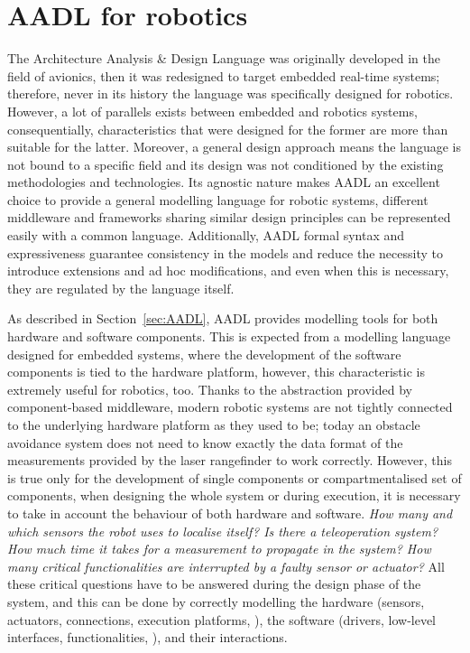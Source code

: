 \section{AADL for robotics}
\label{sec:aadl-robot}
The Architecture Analysis \& Design Language was originally developed in the field of avionics, then it was redesigned to target embedded real-time systems; therefore, never in its history the language was specifically designed for robotics. However, a lot of parallels exists between embedded and robotics systems, consequentially, characteristics that were designed for the former are more than suitable for the latter. Moreover, a general design approach means the language is not bound to a specific field and its design was not conditioned by the existing methodologies and technologies. Its agnostic nature makes AADL an excellent choice to provide a general modelling language for robotic systems, different middleware and frameworks sharing similar design principles can be represented easily with a common language. Additionally, AADL formal syntax and expressiveness guarantee consistency in the models and reduce the necessity to introduce extensions and ad hoc modifications, and even when this is necessary, they are regulated by the language itself.

As described in Section~\ref{sec:AADL}, AADL provides modelling tools for both hardware and software components. This is expected from a modelling language designed for embedded systems, where the development of the software components is tied to the hardware platform, however, this characteristic is extremely useful for robotics, too. Thanks to the abstraction provided by component-based middleware, modern robotic systems are not tightly connected to the underlying hardware platform as they used to be; today an obstacle avoidance system does not need to know exactly the data format of the measurements provided by the laser rangefinder to work correctly. However, this is true only for the development of single components or compartmentalised set of components, when designing the whole system or during execution, it is necessary to take in account the behaviour of both hardware and software. \textit{How many and which sensors the robot uses to localise itself? Is there a teleoperation system? How much time it takes for a measurement to propagate in the system? How many critical functionalities are interrupted by a faulty sensor or actuator?} All these critical questions have to be answered during the design phase of the system, and this can be done by correctly modelling the hardware (sensors, actuators, connections, execution platforms, \etc), the software (drivers, low-level interfaces, functionalities, \etc), and their interactions.

